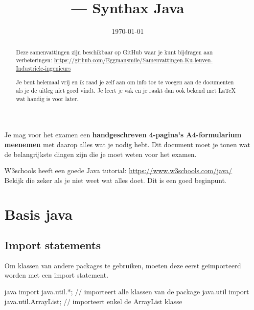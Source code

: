 \documentclass[a4paper,11pt]{article}
\title{\vaknaam{} --- Synthax Java}
\author{\auteur}
\date{\today}
\begin{document}
\maketitle

 
\begin{abstract}
Deze samenvattingen zijn beschikbaar op GitHub waar je kunt bijdragen aan verbeteringen: \url{https://github.com/Eggmansmile/Samenvattingen-Ku-leuven-Industriele-ingenieurs}

Je bent helemaal vrij en ik raad je zelf aan om info toe te voegen aan de documenten als je de uitleg niet goed vindt.
Je leert je vak en je raakt dan ook bekend met LaTeX wat handig is voor later.
\end{abstract}

\vspace{1cm}


Je mag voor het examen een \textbf{handgeschreven 
4-pagina's A4-formularium meenemen} met daarop alles wat je nodig hebt.
Dit document moet je tonen wat de belangrijkste dingen zijn die je moet weten voor het examen.
\newline 

W3schools heeft een goede Java tutorial: \url{https://www.w3schools.com/java/}
Bekijk die zeker als je niet weet wat alles doet. Dit is een goed beginpunt.


\section{Basis java}
\subsection{Import statements}
Om klassen van andere packages te gebruiken, 
moeten deze eerst geïmporteerd worden met een import statement.\\

\begin{codeblock}{java}
    import java.util.*; // importeert alle klassen van de package java.util
    import java.util.ArrayList; // importeert enkel de ArrayList klasse
\end{codeblock}
\end{document}
